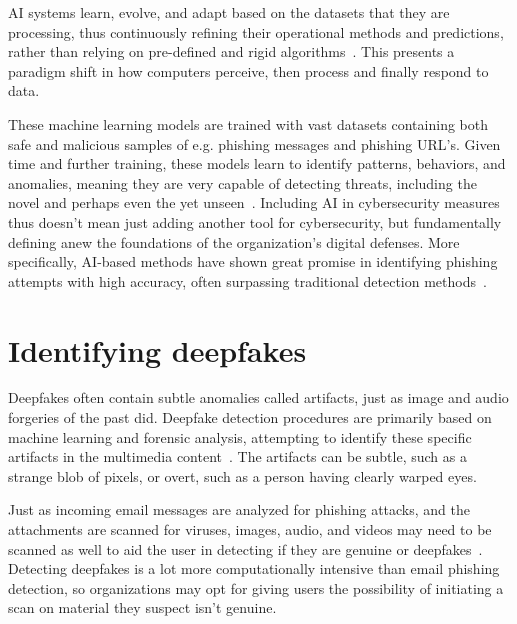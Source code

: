 AI systems learn, evolve, and adapt based on the datasets that they are processing, thus continuously refining their operational methods and predictions, rather than relying on pre-defined and rigid algorithms~\citep{fakhouri_AI_Driven_Solutions_SE_Attacks_2024}. This presents a paradigm shift in how computers perceive, then process and finally respond to data.

These machine learning models are trained with vast datasets containing both safe and malicious samples of e.g. phishing messages and phishing URL's. Given time and further training, these models learn to identify patterns, behaviors, and anomalies, meaning they are very capable of detecting threats, including the novel and perhaps even the yet unseen~\citep{fakhouri_AI_Driven_Solutions_SE_Attacks_2024}. Including AI in cybersecurity measures thus doesn't mean just adding another tool for cybersecurity, but fundamentally defining anew the foundations of the organization’s digital defenses. More specifically, AI-based methods have shown great promise in identifying phishing attempts with high accuracy, often surpassing traditional detection methods~\citep{basit_Comprehensive_Survey_AI_Phishing_Detection_2021}.




\section{Identifying deepfakes}
\begin{comment}
\end{comment}
Deepfakes often contain subtle anomalies called artifacts, just as image and audio forgeries of the past did. Deepfake detection procedures are primarily based on machine learning and forensic analysis, attempting to identify these specific artifacts in the multimedia content~\citep{mirsky_Creation_Detection_Deepfakes_2021}. The artifacts can be subtle, such as a strange blob of pixels, or overt, such as a person having clearly warped eyes.

Just as incoming email messages are analyzed for phishing attacks, and the attachments are scanned for viruses, images, audio, and videos may need to be scanned as well to aid the user in detecting if they are genuine or deepfakes~\citep{mirsky_Creation_Detection_Deepfakes_2021}. Detecting deepfakes is a lot more computationally intensive than email phishing detection, so organizations may opt for giving users the possibility of initiating a scan on material they suspect isn’t genuine.

